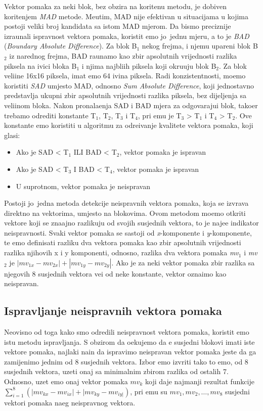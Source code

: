 Vektor pomaka za neki blok, bez obzira na kori\sh tenu metodu, je dobiven kori\sh tenjem \textit{MAD} metode. Me\dj utim, MAD nije efektivan u situacijama u kojima postoji veliki broj kandidata sa istom MAD mjerom.
Da bismo preciznije izra\ch unali ispravnost vektora pomaka, koristit \cj emo jo\sh\ jednu mjeru, a to je \textit{BAD} (\textit{Boundary Absolute Difference}). Za blok B$_1$ nekog frejma, i njemu upareni blok B$_2$ iz narednog
frejma, BAD ra\ch unamo kao zbir apsolutnih vrijednosti razlika piksela na ivici bloka B$_1$ i njima najbli\zh ih piksela koji okru\zh uju blok B$_2$. %
Za blok veli\ch ine 16x16 piksela, imat \cj emo 64 ivi\ch na piksela. Radi konzistentnosti, mo\zh emo koristiti \textit{SAD} umjesto MAD, odnosno \textit{Sum Absolute Difference}, koji jednostavno predstavlja ukupni zbir
apsolutnih vrijednosti razlika piksela, bez dijeljenja sa veli\ch inom bloka. Nakon pronala\zh enja SAD i BAD mjera za odgovaraju\cj i blok, tako\dj er trebamo odrediti konstante T$_1$, T$_2$, T$_3$ i T$_4$, pri \ch emu je T$_3$ > T$_1$ i T$_4$ > T$_2$. 
Ove konstante \cj emo koristiti u algoritmu za odre\dj ivanje kvalitete vektora pomaka, koji glasi:
\begin{itemize}
	\item Ako je SAD < T$_1$ ILI BAD < T$_2$, vektor pomaka je ispravan
	\item Ako je SAD < T$_3$ I BAD < T$_4$, vektor pomaka je ispravan
	\item U suprotnom, vektor pomaka je neispravan
\end{itemize}

Postoji jo\sh\ jedna metoda detekcije neispravnih vektora pomaka, koja se izvr\sh ava direktno na vektorima, umjesto na blokovima. Ovom metodom mo\zh emo otkriti vektore koji se zna\ch ajno razlikuju od svojih susjednih vektora,
\sh to je naj\ch e\sh \cj e indikator neispravnosti. Svaki vektor pomaka se sastoji od \textit{x}-komponente i \textit{y}-komponente, te \cj emo definisati razliku dva vektora pomaka kao zbir apsolutnih vrijednosti razlika njihovih
x i y komponenti, odnosno, razlika dva vektora pomaka \textit{mv$_1$} i \textit{mv$_2$} je $|mv_{1x} - mv_{2x}| + |mv_{1y} - mv_{2y}|$. Ako je za neki vektor pomaka zbir razlika sa njegovih 8 susjednih vektora ve\cj i od neke
konstante, vektor ozna\ch imo kao neispravan.

\subsection{Ispravljanje neispravnih vektora pomaka}
Neovisno od toga kako smo odredili neispravnost vektora pomaka, koristit \cj emo istu metodu ispravljanja\cite{lowcomplexity}. S obzirom da o\ch ekujemo da \cj e susjedni blokovi imati iste vektore pomaka, najlak\sh i na\ch in da ispravimo neispravan 
vektor pomaka jeste da ga zamijenimo jednim od 8 susjednih vektora. Izbor \cj emo izvr\sh iti tako \sh to \cj emo, od 8 susjednih vektora, uzeti onaj sa minimalnim zbirom razlika od ostalih 7. Odnosno, uzet \cj emo onaj vektor pomaka
$mv_k$ koji daje najmanji rezultat funkcije $\sum_{i=1}^{8}(|mv_{kx}-mv_{ix}|+|mv_{ky}-mv_{iy|})$, pri \ch emu su $mv_1, mv_2, \ldots , mv_8$ susjedni vektori pomaka na\sh eg neispravnog vektora.


